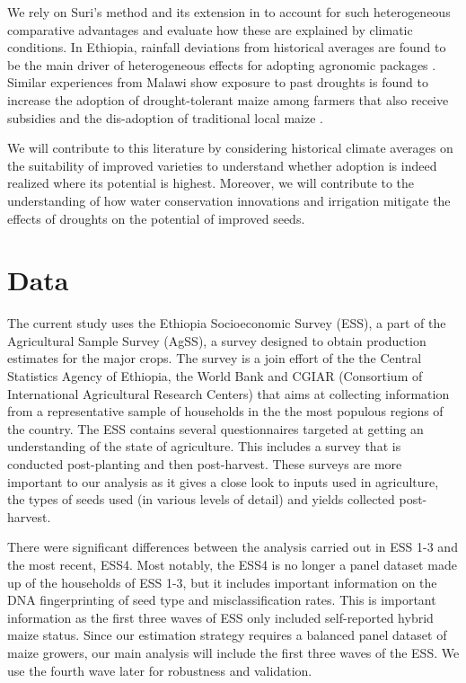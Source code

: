 \documentclass{article}
\begin{document}
We rely on Suri’s method and its extension in \citep{Tjernstrom_Emilia_Dalia_Ghanem_Oscar_Barriga_Cabanillas_Travis_J_Lybbert_Jeffrey_D_Michler_and_Aleksandr_Michuda2020-bc} to account for such heterogeneous comparative advantages and evaluate how these are explained by climatic conditions. In Ethiopia, rainfall deviations from historical averages are found to be the main driver of heterogeneous effects for adopting agronomic packages \citep{Marenya2020-kb}. Similar experiences from Malawi show exposure to past droughts is found to increase the adoption of drought-tolerant maize among farmers that also receive subsidies \citep{Katengeza2019-af} and the dis-adoption of traditional local maize \citep{Holden2016-vy}.

We will contribute to this literature by considering historical climate averages on the suitability of improved varieties to understand whether adoption is indeed realized where its potential is highest. Moreover, we will contribute to the understanding of how water conservation innovations and irrigation mitigate the effects of droughts on the potential of improved seeds.

\section{Data}

The current study uses the Ethiopia Socioeconomic Survey (ESS), a part of the Agricultural Sample Survey (AgSS), a survey designed to obtain production estimates for the major crops. The survey is a join effort of the the Central Statistics Agency of Ethiopia, the World Bank and CGIAR (Consortium of International Agricultural Research Centers) \citep{kosmowski2020shining} that aims at collecting information from a representative sample of households in the  the most populous regions of the country. The ESS contains several questionnaires targeted at getting an understanding of the state of agriculture. This includes a survey that is conducted post-planting and then post-harvest. These surveys are more important to our analysis as it gives a close look to inputs used in agriculture, the types of seeds used (in various levels of detail) and yields collected post-harvest.

There were significant differences between the analysis carried out in ESS 1-3 and the most recent, ESS4. Most notably, the ESS4 is no longer a panel dataset made up of the households of ESS 1-3, but it includes important information on the DNA fingerprinting of seed type and misclassification rates. This is important information as the first three waves of ESS only included self-reported hybrid maize status. Since our estimation strategy requires a balanced panel dataset of maize growers, our main analysis will include the first three waves of the ESS. We use the fourth wave later for robustness and validation.
\end{document}
